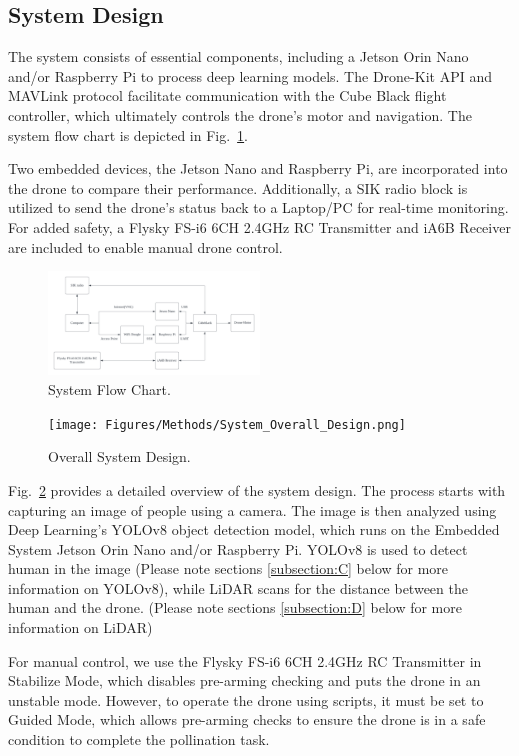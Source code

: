 \subsection{System Design}\label{subsection:B}

The system consists of essential components, including a Jetson Orin Nano and/or Raspberry Pi to process deep learning models. The Drone-Kit API and MAVLink protocol facilitate communication with the Cube Black flight controller, which ultimately controls the drone's motor and navigation. The system flow chart is depicted in Fig.~\ref{fig2b1}.

Two embedded devices, the Jetson Nano and Raspberry Pi, are incorporated into the drone to compare their performance. Additionally, a SIK radio block is utilized to send the drone's status back to a Laptop/PC for real-time monitoring. For added safety, a Flysky FS-i6 6CH 2.4GHz RC Transmitter and iA6B Receiver are included to enable manual drone control.

    \begin{figure}[H]
        \centerline{\includegraphics[width=0.5\textwidth]{Figures/Methods/System Flow Chart.png}}
        \caption{System Flow Chart.}
        \label{fig2b1}
    \end{figure}

    \begin{figure}[H]
        \centerline{\texttt{[image: Figures/Methods/System\_Overall\_Design.png]}}
        \caption{Overall System Design.}
        \label{fig2b2}
    \end{figure}

Fig.~\ref{fig2b2} provides a detailed overview of the system design. The process starts with capturing an image of people using a camera. The image is then analyzed using Deep Learning's YOLOv8 object detection model, which runs on the Embedded System Jetson Orin Nano and/or Raspberry Pi. YOLOv8 is used to detect human in the image (Please note sections \ref{subsection:C} below for more information on YOLOv8), while LiDAR scans for the distance between the human and the drone. (Please note sections \ref{subsection:D} below for more information on LiDAR)


For manual control, we use the Flysky FS-i6 6CH 2.4GHz RC Transmitter in Stabilize Mode, which disables pre-arming checking and puts the drone in an unstable mode. However, to operate the drone using scripts, it must be set to Guided Mode, which allows pre-arming checks to ensure the drone is in a safe condition to complete the pollination task.